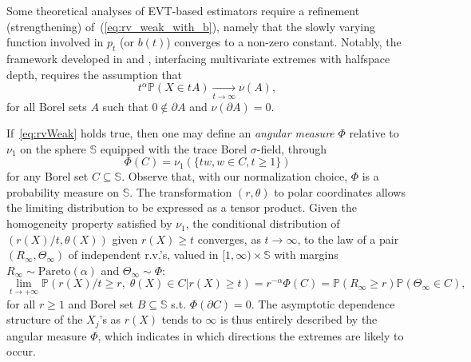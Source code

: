 \documentclass{article}
\numberwithin{equation}{section}
\renewcommand{\P}{\mathbb{P}}
\newcommand{\PP}{\P}%
\newcommand{\sphere}{\mathbb{S}}
\newcommand{\tto}{\xrightarrow[t\to\infty]{}}
\begin{document}
 Some theoretical analyses of EVT-based estimators require a refinement (strengthening) of~(\ref{eq:rv_weak_with_b}), namely that the slowly varying function involved in $p_t$ (or $b(t)$) converges  to  a non-zero constant. 
Notably, the framework developed in \cite{einmahl2015bridging} and
\cite{he2017estimation}, interfacing
multivariate extremes with halfspace depth,  requires the  assumption that %
\begin{equation}
    \label{eq:rvStrong}
    t^\alpha \PP(X \in tA) \tto \nu(A), 
\end{equation}
for all Borel sets $A$ such that $0\notin\partial A$ and $\nu(\partial A) = 0$.

If~\eqref{eq:rvWeak} holds true, then
one may define an \emph{angular measure} $\Phi$ relative to $\nu_1$ on the sphere $\sphere$ equipped with the trace Borel $\sigma$-field, through
\begin{equation}\label{eq:def_angular_measure}
    \Phi(C) = \nu_1\left(\{tw, w\in C, t \ge 1 \}\right) %
\end{equation}
for any Borel set $C\subseteq \sphere$.
Observe that, with our normalization choice, $\Phi$ is a probability measure on $\sphere$. The transformation $(r,\theta)$ to polar coordinates allows the limiting distribution to be expressed as a tensor product. Given the homogeneity property satisfied by $\nu_1$, the conditional distribution of $(r(X)/t,\theta(X))$ given $r(X)\geq t$ converges, as $t\to \infty$, to the law of a pair $(R_\infty, \Theta_\infty)$ of independent r.v.'s, valued in $[1,\infty)\times \mathbb{S}$ with margins $R_\infty\sim\mathrm{Pareto}(\alpha)$ and $\Theta_\infty\sim \Phi$:
\begin{equation}
    \lim_{t\to +\infty}{\P\left(r(X)/t\geq r,\; \theta(X)\in C| r(X)\geq t\right)} = r^{-\alpha}\Phi(C) =\PP(R_{\infty}\geq r) \PP(\Theta_\infty \in C),
    \label{eq:limit_form_angular}
\end{equation}
for all $r\geq 1$ and Borel set $B\subseteq \sphere$ s.t. $\Phi(\partial C)=0$. The asymptotic dependence structure of the $X_j$'s as $r(X)$ tends to $\infty$ is thus entirely described by the angular measure $\Phi$, which indicates in which directions the extremes are likely to occur.



\end{document}
